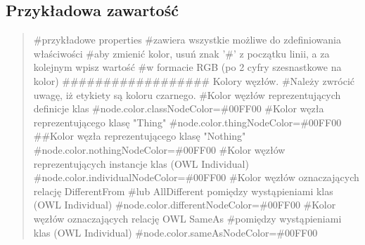 \documentclass[a4paper,10pt]{article}
\begin{document}
\subsection{Przykładowa zawartość}
\begin{quote}

\#przykładowe properties \newline
\#zawiera wszystkie możliwe do zdefiniowania właściwości \newline
\#aby zmienić kolor, usuń znak '\#' z początku linii, a za kolejnym wpisz wartość \newline
\#w formacie RGB (po 2 cyfry szesnastkowe na kolor) \newline
 \newline
\#\#\#\#\#\#\#\#\#\#\#\#\#\#\#\#\#\# Kolory węzłów. \newline
\#Należy zwrócić uwagę, iż etykiety są koloru czarnego. \newline
 \newline
\#Kolor węzłów reprezentujących definicje klas \newline
\#node.color.classNodeColor=\#00FF00 \newline
 \newline
\#Kolor węzła reprezentującego klasę "Thing" \newline
\#node.color.thingNodeColor=\#00FF00 \newline
 \newline
\#\#Kolor węzła reprezentującego klasę "Nothing" \newline
\#node.color.nothingNodeColor=\#00FF00 \newline
 \newline
\#Kolor węzłów reprezentujących instancje klas (OWL Individual) \newline
\#node.color.individualNodeColor=\#00FF00 \newline
 \newline
\#Kolor węzłów oznaczających relację DifferentFrom \newline
\#lub AllDifferent pomiędzy wystąpieniami klas (OWL Individual) \newline
\#node.color.differentNodeColor=\#00FF00 \newline
 \newline
\#Kolor węzłów oznaczających relację OWL SameAs \newline
\#pomiędzy wystąpieniami klas (OWL Individual) \newline
\#node.color.sameAsNodeColor=\#00FF00 \newline
 \newline

\end{quote}
\end{document}
